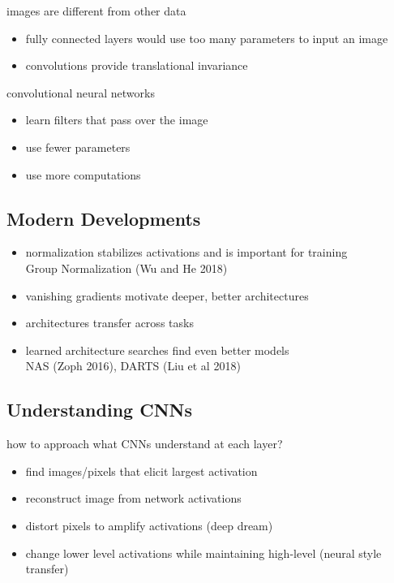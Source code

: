 \documentclass[]{article}
\theoremstyle{definition}
\begin{document}
    images are different from other data
    \begin{itemize}
        \item fully connected layers would use too many parameters to input an image
        \item convolutions provide translational invariance
    \end{itemize}

    convolutional neural networks
    \begin{itemize}
        \item learn filters that pass over the image
        \item use fewer parameters
        \item use more computations
    \end{itemize}

    \subsection{Modern Developments}%
    \label{sub:modern_developments}

    \begin{itemize}
        \item normalization stabilizes activations and is important for training \\
            Group Normalization (Wu and He 2018)
        \item vanishing gradients motivate deeper, better architectures
        \item architectures transfer across tasks
        \item learned architecture searches find even better models \\
            NAS (Zoph 2016), DARTS (Liu et al 2018)
    \end{itemize}

    \subsection{Understanding CNNs}%
    \label{sub:understanding_cnns}

    how to approach what CNNs understand at each layer?
    \begin{itemize}
        \item find images/pixels that elicit largest activation
        \item reconstruct image from network activations
        \item distort pixels to amplify activations (deep dream)
        \item change lower level activations while maintaining high-level (neural style transfer)
    \end{itemize}
\end{document}
